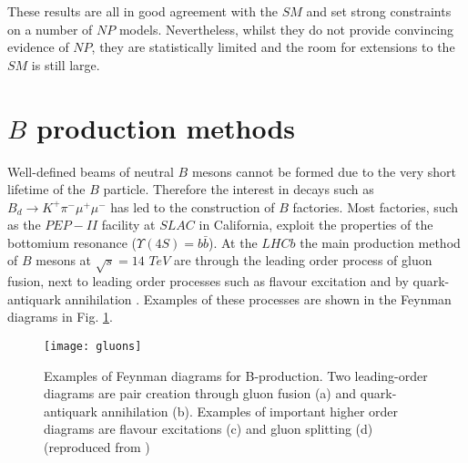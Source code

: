 \documentclass[a4paper,12pt]{article}
\begin{document}
These results are all in good agreement with the $SM$ and set strong constraints on a number of $NP$ models. Nevertheless, whilst they do not provide convincing evidence of $NP$, they are statistically limited and the room for extensions to the $SM$ is still large. 

\section{$B$ production methods}
Well-defined beams of neutral $B$ mesons cannot be formed due to the very short lifetime of the $B$ particle. Therefore the interest in decays such as $B_d  \rightarrow K^+  \pi^-\mu^+\mu^-$ has led to the construction of $B$ factories. Most factories, such as the $PEP-II$ facility at $SLAC$ in California, exploit the properties of the bottomium resonance ($\Upsilon (4S) = b \bar b$). At the $LHCb$ the main production method of $B$ mesons at $\sqrt{s} = 14$ $TeV$ are through the leading order process of gluon fusion, next to leading order processes such as flavour excitation and by quark-antiquark annihilation \cite{papadelis}. Examples of these processes are shown in the Feynman diagrams in Fig. \ref{gluons}.

\begin{figure}
\texttt{[image: gluons]}
\caption{Examples of Feynman diagrams for B-production. Two leading-order diagrams are pair creation through gluon fusion (a) and quark-antiquark annihilation (b). Examples of important higher order diagrams are flavour excitations (c) and gluon splitting (d) (reproduced from \cite[p. 15]{papadelis})}
\label{gluons}
\end{figure}


%
%
%
\end{document}
